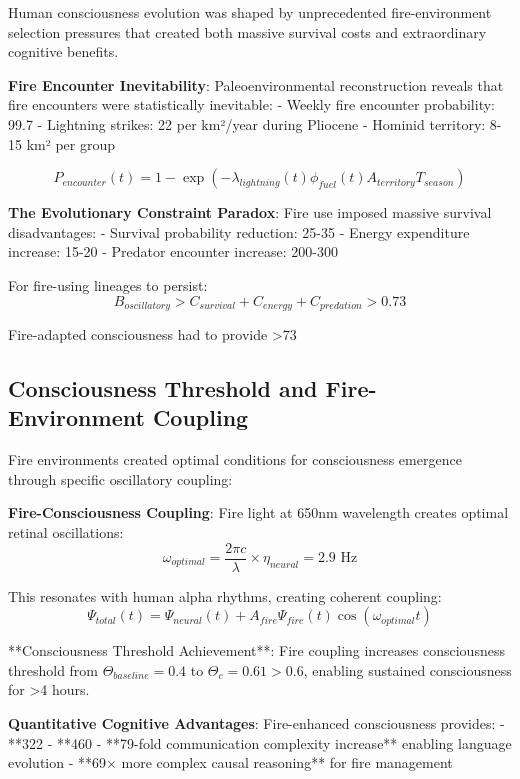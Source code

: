 \documentclass[12pt]{article}
\begin{document}
Human consciousness evolution was shaped by unprecedented fire-environment selection pressures that created both massive survival costs and extraordinary cognitive benefits.

\textbf{Fire Encounter Inevitability}: Paleoenvironmental reconstruction reveals that fire encounters were statistically inevitable:
- Weekly fire encounter probability: 99.7%
- Lightning strikes: 22 per km²/year during Pliocene
- Hominid territory: 8-15 km² per group

$$P_{encounter}(t) = 1 - \exp\left(-\lambda_{lightning}(t) \phi_{fuel}(t) A_{territory} T_{season}\right)$$

\textbf{The Evolutionary Constraint Paradox}: Fire use imposed massive survival disadvantages:
- Survival probability reduction: 25-35%
- Energy expenditure increase: 15-20%
- Predator encounter increase: 200-300%

For fire-using lineages to persist:
$$B_{oscillatory} > C_{survival} + C_{energy} + C_{predation} > 0.73$$

Fire-adapted consciousness had to provide >73%

\subsection{Consciousness Threshold and Fire-Environment Coupling}

Fire environments created optimal conditions for consciousness emergence through specific oscillatory coupling:

\textbf{Fire-Consciousness Coupling}: Fire light at 650nm wavelength creates optimal retinal oscillations:
$$\omega_{optimal} = \frac{2\pi c}{\lambda} \times \eta_{neural} = 2.9 \text{ Hz}$$

This resonates with human alpha rhythms, creating coherent coupling:
$$\Psi_{total}(t) = \Psi_{neural}(t) + A_{fire}\Psi_{fire}(t)\cos(\omega_{optimal}t)$$

**Consciousness Threshold Achievement**: Fire coupling increases consciousness threshold from $\Theta_{baseline} = 0.4$ to $\Theta_c = 0.61 > 0.6$, enabling sustained consciousness for >4 hours.

\textbf{Quantitative Cognitive Advantages}: Fire-enhanced consciousness provides:
- **322%
- **460%
- **79-fold communication complexity increase** enabling language evolution
- **69× more complex causal reasoning** for fire management
\end{document}
